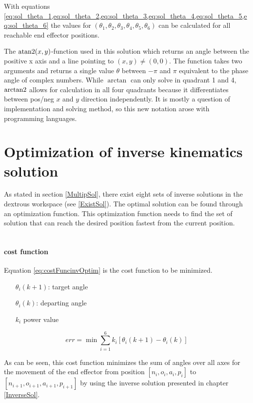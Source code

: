 With equations \cref{eq:sol_theta_1,eq:sol_theta_2,eq:sol_theta_3,eq:sol_theta_4,eq:sol_theta_5,eq:sol_theta_6} the values for $(\theta_1, \theta_2, \theta_3, \theta_4, \theta_5, \theta_6)$ can be calculated for all reachable end effector positions.

The $\operatorname{atan2}(x,y)$-function used in this solution which returns an angle between the positive x axis and a line pointing to $(x,y) \neq (0,0)$. The function takes two arguments and returns a single value $\theta$ between $-\pi$ and $\pi$ equivalent to the phase angle of complex numbers. While $\arctan$ can only solve in quadrant 1 and 4, $\operatorname{arctan2}$ allows for calculation in all four quadrants because it differentiates between pos/neg $x$  and  $y$ direction independently. It is mostly a question of implementation and solving method, so this new notation arose with programming languages.


\section{Optimization of inverse kinematics solution}

As stated in section \ref{MultipSol}, there exist eight sets of inverse solutions in the dextrous workspace (see \ref{ExistSol}).
The optimal solution can be found through an optimization function. 
This optimization function needs to find the set of solution that can reach the desired position fastest from the current position.\\
\\
\paragraph{cost function}
Equation \ref{eq:costFuncinvOptim} is the cost function to be minimized.
\begin{itemize}
	\item[$\theta_i (k+1)$:] target angle
	\item[$\theta_i(k)$:] departing angle
	\item[$k_i$] power value
\end{itemize}

\begin{equation}\label{eq:costFuncinvOptim}
	err =  \min\sum_{i=1}^{6} k_i [\theta_i (k+1) - \theta_i(k)] 
\end{equation}

As can be seen, this cost function minimizes the sum of angles over all axes for the movement of the end effector from position $[n_i,o_i,a_i,p_i ]$ to $[n_{i+1}, o_{i+1}, a_{i+1}, p_{i+1}]$ by using the inverse solution presented in chapter \ref{InverseSol}.

